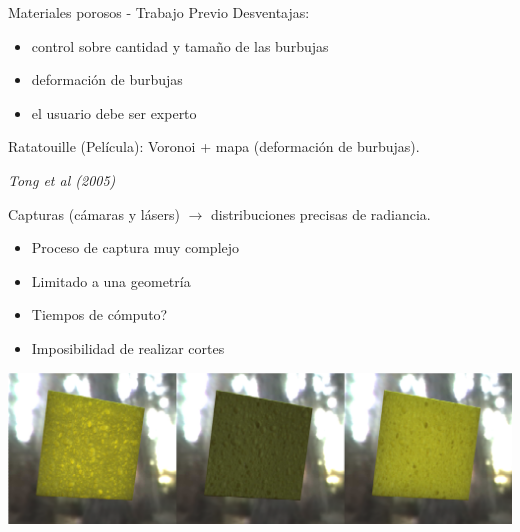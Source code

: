 \documentclass[spanish,unknownkeysallowed]{beamer}
\begin{document}
\begin{frame}{Materiales porosos - Trabajo Previo}
Desventajas: 
\begin{block}{}
\begin{itemize}
\item control sobre cantidad y tamaño de las burbujas
\item deformación de burbujas
\item el usuario debe ser experto
\end{itemize}
\end{block}

Ratatouille (Película): Voronoi + mapa (deformación de burbujas).

\end{frame}

\begin{frame}

{\it Tong et al (2005)}

Capturas (cámaras y lásers) $\rightarrow$ distribuciones precisas de radiancia.

\begin{itemize}
\item Proceso de captura muy complejo
\item Limitado a una geometría
\item Tiempos de cómputo?
\item Imposibilidad de realizar cortes
\end{itemize}

\includegraphics[scale = 0.3]{../figures/esponja}

\end{frame}
\end{document}
